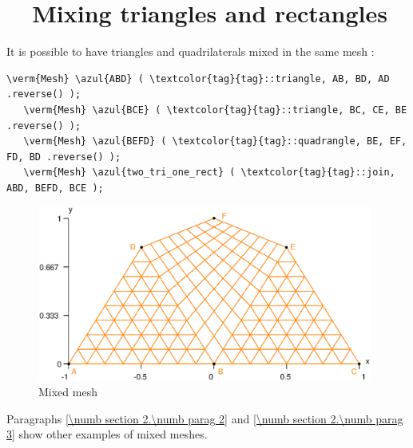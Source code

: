 \section{~~Mixing triangles and rectangles}\label{\numb section 1.\numb parag 6}

It is possible to have triangles and quadrilaterals mixed in the same mesh :

\begin{Verbatim}[commandchars=\\\{\},formatcom=\small\tt,frame=single,
   label=parag-\ref{\numb section 1.\numb parag 6}.cpp,rulecolor=\color{coment},
   baselinestretch=0.94,framesep=2mm]
   \verm{Mesh} \azul{ABD} ( \textcolor{tag}{tag}::triangle, AB, BD, AD .reverse() );
   \verm{Mesh} \azul{BCE} ( \textcolor{tag}{tag}::triangle, BC, CE, BE .reverse() );
   \verm{Mesh} \azul{BEFD} ( \textcolor{tag}{tag}::quadrangle, BE, EF, FD, BD .reverse() );
   \verm{Mesh} \azul{two_tri_one_rect} ( \textcolor{tag}{tag}::join, ABD, BEFD, BCE );
\end{Verbatim}

\begin{figure}[ht] \centering
  \includegraphics[width=110mm]{two-tri-one-rect}
  \caption{Mixed mesh}
  \label{\numb section 1.\numb fig 8}
\end{figure}

Paragraphs \ref{\numb section 2.\numb parag 2} and \ref{\numb section 2.\numb parag 3}
show other examples of mixed meshes.



